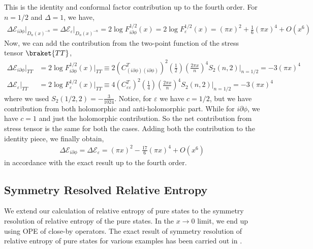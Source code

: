 \documentclass[11pt]{article}
\newcommand{\p}{\partial}
\newcommand{\lb}{\left(}
\newcommand{\rb}{\right)}
\begin{document}
This is the identity and conformal factor contribution up to the fourth order. For $n=1/2$ and $\Delta = 1$, we have,
\begin{align}
    \Delta\mathcal{E}_{i\p\phi}\Big|_{D_n(x)^{-n}} = \Delta\mathcal{E}_{\varepsilon}\Big|_{D_n(x)^{-n}}=2\log F_{i\p\phi}^{1/2}(x) = 2\log F_{\varepsilon}^{1/2}(x) =(\pi x)^2 + \frac{1}{6}(\pi x)^4 + O(x^6)
\end{align}
Now, we can add the contribution from the two-point function of the stress tensor $\braket{TT}$,
\begin{align}
     \Delta \mathcal{E}_{i\p\phi}\Big|_{TT }&=2\log F_{i\p\phi}^{1/2}(x)\Big|_{TT }\equiv 2\lb C^T_{(i\p\phi)(i\p\phi)}\rb^2 \lb\frac{1}{2}\rb \lb\frac{2\pi x}{n}\rb^4 S_2(n,2)\Bigg|_{n=1/2} = -3(\pi x)^4 \\
     \Delta \mathcal{E}_{\varepsilon}\Big|_{TT }&=2\log F_{\varepsilon}^{1/2}(x)\Big|_{TT }\equiv 4\lb C^T_{\varepsilon\varepsilon}\rb^2 \lb\frac{1}{4}\rb\lb\frac{2\pi x}{n}\rb^4 S_2(n,2)\Bigg|_{n=1/2} = -3(\pi x)^4 
\end{align}
where we used $S_2(1/2,2) = -\frac{3}{1024}$.
Notice, for $\varepsilon$ we have $c = 1/2$, but we have contribution from both holomorphic and anti-holomorphic part. While for $i\p\phi$, we have $c=1$ and just the holomorphic contribution. So the net contribution from stress tensor is the same for both the cases.
Adding both the contribution to the identity piece, we finally obtain,
\begin{align}
    \Delta\mathcal{E}_{i\p\phi} = \Delta\mathcal{E}_{\varepsilon}=(\pi x)^2 -\frac{17}{6}(\pi x)^4 +O(x^6)
\end{align}
in accordance with the exact result up to the fourth order.


\subsection{Symmetry Resolved Relative Entropy}
We extend our calculation of relative entropy of pure states to the symmetry resolution of relative entropy of the pure states. In the $x\to 0$ limit, we end up using OPE of close-by operators. The exact result of symmetry resolution of relative entropy of pure states for various examples has been carried out in \cite{Chen_2021}.
\end{document}
